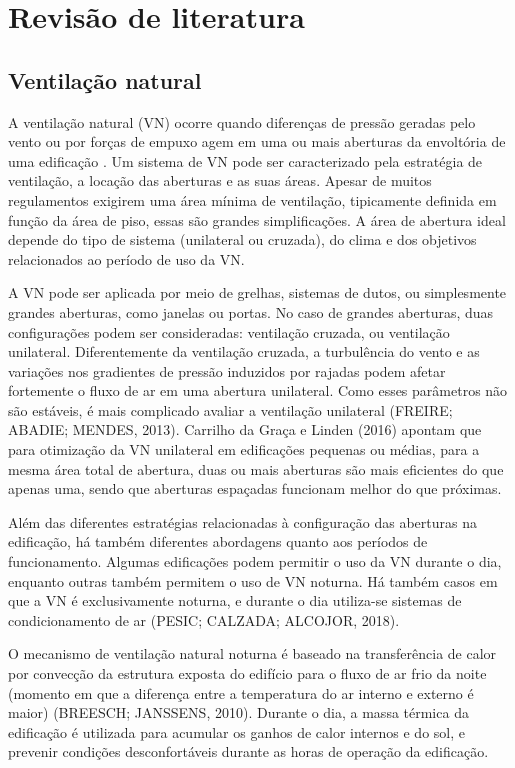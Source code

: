 \documentclass[brazil,hardcopy,openany,a5paper]{ufscthesis}
\begin{document}
	\mainmatter

\chapter{Revisão de literatura}
	
	\section{Ventilação natural}
	
	A ventilação natural (VN) ocorre quando diferenças de pressão geradas pelo vento ou por forças de empuxo agem em uma ou mais aberturas da envoltória de uma edificação \cite{CarrilhodaGraca2016}. Um sistema de VN pode ser caracterizado pela estratégia de ventilação, a locação das aberturas e as suas áreas. Apesar de muitos regulamentos exigirem uma área mínima de ventilação, tipicamente definida em função da área de piso, essas são grandes simplificações. A área de abertura ideal depende do tipo de sistema (unilateral ou cruzada), do clima e dos objetivos relacionados ao período de uso da VN.
	
	A VN pode ser aplicada por meio de grelhas, sistemas de dutos, ou simplesmente grandes aberturas, como janelas ou portas. No caso de grandes aberturas, duas configurações podem ser consideradas: ventilação cruzada, ou ventilação unilateral. Diferentemente da ventilação cruzada, a turbulência do vento e as variações nos gradientes de pressão induzidos por rajadas podem afetar fortemente o fluxo de ar em uma abertura unilateral. Como esses parâmetros não são estáveis, é mais complicado avaliar a ventilação unilateral (FREIRE; ABADIE; MENDES, 2013). Carrilho da Graça e Linden (2016) apontam que para otimização da VN unilateral em edificações pequenas ou médias, para
	a mesma área total de abertura, duas ou mais aberturas são mais eficientes do que apenas uma, sendo que aberturas espaçadas funcionam melhor do que próximas.
	
	Além das diferentes estratégias relacionadas à configuração das aberturas na edificação, há também diferentes abordagens quanto aos períodos de funcionamento. Algumas edificações podem permitir o uso da VN durante o dia, enquanto outras também permitem o uso de VN noturna. Há também casos em que a VN é exclusivamente noturna, e durante o dia utiliza-se sistemas de condicionamento de ar (PESIC; CALZADA; ALCOJOR, 2018).
	
	O mecanismo de ventilação natural noturna é baseado na transferência de calor por convecção da estrutura exposta do edifício para o fluxo de ar frio da noite (momento em que a diferença entre a temperatura do ar interno e externo é maior) (BREESCH; JANSSENS, 2010). Durante o dia, a massa térmica da	edificação é utilizada para acumular os ganhos de calor internos e do sol, e prevenir condições desconfortáveis durante as horas de operação da edificação.
	
\end{document}
